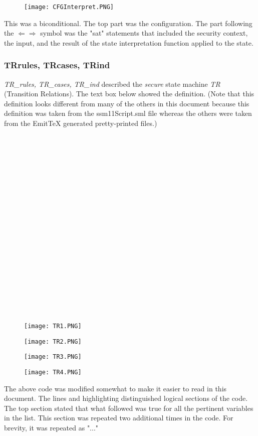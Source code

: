   \begin{figure}[h]
  \centering
  \texttt{[image: CFGInterpret.PNG]}
\end{figure}

 This was a biconditional.  The top part was the configuration.   The part following
  the $\Leftarrow \Rightarrow$ symbol was the "sat" statements that included the security context, the input,
  and the result of the state interpretation function applied to the state.


 \subsubsection{TR\textunderscore rules, TR\textunderscore cases, TR\textunderscore ind}
\label{sec:trtext-rules-trtext}


  \textit{TR_rules, TR_cases, TR_ind} described the \textit{secure} state machine \textit{TR}
  (Transition Relations).  The text box below showed the definition.  (Note that this definition
  looks different from many of the others in this document because this definition was taken from
  the ssm11Script.sml file whereas the others were taken from the EmitTeX generated pretty-printed files.)\\\\\\
  \\\\\\\\\\\\\\\\\\\\\\\\\\\\\\\\\\
  \begin{figure}[h!]
  \centering
  \texttt{[image: TR1.PNG]}
\end{figure}

\begin{figure}[h!]
  \centering
  \texttt{[image: TR2.PNG]}
\end{figure}
\begin{figure}[h!]
  \centering
  \texttt{[image: TR3.PNG]}
\end{figure}
\begin{figure}[h!]
  \centering
  \texttt{[image: TR4.PNG]}
\end{figure}
 The above code was modified somewhat to make it easier to read in this document.
  The lines and highlighting distinguished logical sections of the code.  The top section
  stated that what followed was true for all the pertinent variables in the list.  This
  section was repeated two additional times in the code.  For brevity, it was repeated as "..."\\

